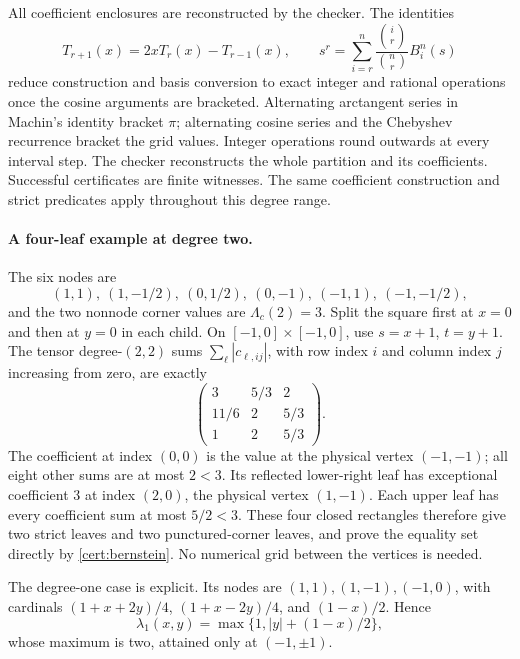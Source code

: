 All coefficient enclosures are reconstructed by the checker. The identities
\[
 T_{r+1}(x)=2xT_r(x)-T_{r-1}(x),\qquad
 s^r=\sum_{i=r}^n\frac{\binom{i}{r}}{\binom nr}B_i^n(s)
\]
reduce construction and basis conversion to exact integer and rational
operations once the cosine arguments are bracketed. Alternating arctangent
series in Machin's identity bracket $\pi$; alternating cosine series and
the Chebyshev recurrence bracket the grid values. Integer operations round
outwards at every interval step. The checker reconstructs the whole
partition and its coefficients. Successful certificates are finite witnesses.
The same coefficient construction and strict predicates apply throughout
this degree range.

\paragraph{A four-leaf example at degree two.}
The six nodes are
\[
 (1,1),\ (1,-1/2),\ (0,1/2),\ (0,-1),\ (-1,1),\ (-1,-1/2),
\]
and the two nonnode corner values are $\Lambda_c(2)=3$.
Split the square first at $x=0$ and then at $y=0$ in each child.
On $[-1,0]\times[-1,0]$, use $s=x+1$, $t=y+1$.
The tensor degree-$(2,2)$ sums $\sum_\ell|c_{\ell,ij}|$, with
row index $i$ and column index $j$ increasing from zero, are exactly
\[
 \begin{pmatrix}
 3&5/3&2\\
 11/6&2&5/3\\
 1&2&5/3
 \end{pmatrix}.
\]
The coefficient at index $(0,0)$ is the value at the physical vertex
$(-1,-1)$; all eight other sums are at most $2<3$.
Its reflected lower-right leaf has exceptional coefficient $3$ at
index $(2,0)$, the physical vertex $(1,-1)$.
Each upper leaf has every coefficient sum at most $5/2<3$.
These four closed rectangles therefore give two strict leaves and two
punctured-corner leaves, and prove the equality set directly by
\eqref{cert:bernstein}. No numerical grid between the vertices is needed.

The degree-one case is explicit. Its nodes
are $(1,1),(1,-1),(-1,0)$, with cardinals
$(1+x+2y)/4$, $(1+x-2y)/4$, and $(1-x)/2$. Hence
\[
 \lambda_1(x,y)=\max\{1,|y|+(1-x)/2\},
\]
whose maximum is two, attained only at $(-1,\pm1)$.

